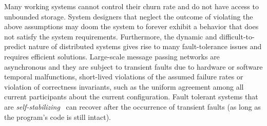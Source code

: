 \documentclass[11pt]{article}
\begin{document}
Many working systems cannot control their churn rate and do not have access to unbounded storage. System designers that neglect the outcome of violating the above assumptions may doom the system to forever exhibit a behavior that does not satisfy the system requirements. Furthermore, the dynamic and difficult-to-predict nature of distributed systems gives rise to many fault-tolerance issues and requires efficient solutions. Large-scale message passing networks are asynchronous and they are subject to transient faults due to hardware or software temporal malfunctions, short-lived violations of the assumed failure rates or violation of correctness invariants, such as the uniform agreement among all current participants about the current configuration. Fault tolerant systems that are {\em self-stabilizing}~\cite{D2K} can recover after the occurrence of transient faults (as long as the program's code is still intact).
\end{document}
